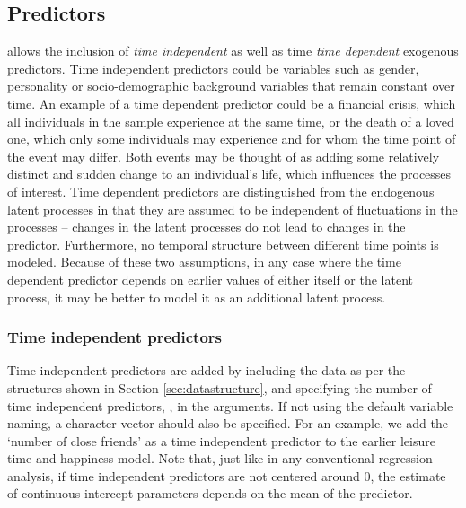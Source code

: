 \documentclass[nojss]{jss}\usepackage[]{graphicx}\usepackage[]{color}
\begin{document}
\subsection{Predictors} \label{sec:predictors}\nopagebreak
{} allows the inclusion of \textit{time independent} as well as time \textit{time dependent} exogenous predictors. Time independent predictors could be variables such as gender, personality or socio-demographic background variables that remain constant over time. An example of a time dependent predictor could be a financial crisis, which all individuals in the sample experience at the same time, or the death of a loved one, which only some individuals may experience and for whom the time point of the event may differ. Both events may be thought of as adding some relatively distinct and sudden change to an individual's life, which influences the processes of interest. Time dependent predictors are distinguished from the endogenous latent processes in that they are assumed to be independent of fluctuations in the processes -- changes in the latent processes do not lead to changes in the predictor. Furthermore, no temporal structure between different time points is modeled. Because of these two assumptions, in any case where the time dependent predictor depends on earlier values of either itself or the latent process, it may be better to model it as an additional latent process.

\subsubsection{Time independent predictors} \label{sec:tipreds}\nopagebreak
Time independent predictors are added by including the data as per the structures shown in Section \ref{sec:datastructure}, and specifying the number of time independent predictors, , in the  arguments. If not using the default variable naming, a  character vector should also be specified. For an example, we add the `number of close friends' as a time independent predictor to the earlier leisure time and happiness model. Note that, just like in any conventional regression analysis, if time independent predictors are not centered around 0, the estimate of continuous intercept parameters depends on the mean of the predictor. 
\end{document}

